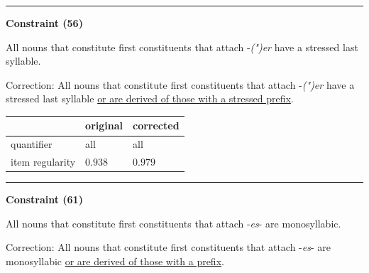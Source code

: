 \vspace{-0.75em}
\hrule



\newpage

\vspace{0.6em}

\begin{center}
\textbf{Constraint (56)}
\end{center}

\noindent
All nouns that constitute first constituents that attach -\textit{(")er} have a stressed last syllable.
\vspace{0.3em}

\noindent
Correction: All nouns that constitute first constituents that attach -\textit{(")er} have a stressed last syllable \underline{or are derived of those with a stressed prefix}.

\vspace{-0.25em}

\begin{table}[!ht]

\begin{center}

\begin{tabularx}{\columnwidth}{|X|X|X|}
      \hline
                        & original      & corrected \\
      \hline
      quantifier        & all      & all   \\
      \hline
      item regularity   & $0.938$      & $0.979$   \\
      \hline
\end{tabularx}
\end{center}
\end{table}

\vspace{-0.75em}
\hrule




\vspace{0.6em}

\begin{center}
\textbf{Constraint (61)}
\end{center}

\noindent
All nouns that constitute first constituents that attach -\textit{es}- are monosyllabic.
\vspace{0.3em}

\noindent
Correction: All nouns that constitute first constituents that attach -\textit{es}- are monosyllabic \underline{or are derived of those with a prefix}.

